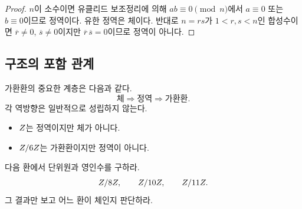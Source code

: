 \begin{proof}
$n$이 소수이면 유클리드 보조정리에 의해 $ab\equiv0\pmod n$에서 $a\equiv0$ 또는 $b\equiv0$이므로 정역이다. 유한 정역은 체이다. 반대로 $n=rs$가 $1<r,s<n$인 합성수이면 $\overline r\ne0$, $\overline s\ne0$이지만 $\overline r\,\overline s=0$이므로 정역이 아니다.
\end{proof}

\subsection{구조의 포함 관계}

가환환의 중요한 계층은 다음과 같다.
\[
  \text{체}\Longrightarrow\text{정역}\Longrightarrow\text{가환환}.
\]
각 역방향은 일반적으로 성립하지 않는다.
\begin{itemize}
  \item $Z$는 정역이지만 체가 아니다.
  \item $Z/6Z$는 가환환이지만 정역이 아니다.
\end{itemize}

\begin{checkpoint}
다음 환에서 단위원과 영인수를 구하라.
\[
  Z/8Z,\qquad Z/10Z,\qquad Z/11Z.
\]
그 결과만 보고 어느 환이 체인지 판단하라.
\end{checkpoint}
